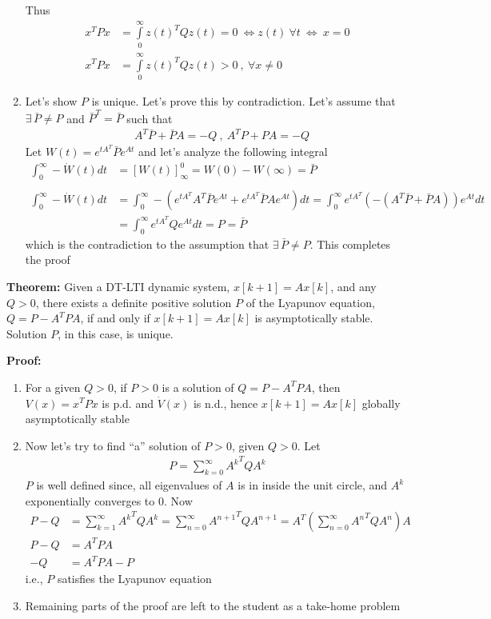 \documentclass[twoside]{article}
\begin{document}
\begin{enumerate}
%
Thus 
%
\begin{align*}
x^T P x &= \int\limits_{0}^{\infty} z(t)^T Q z(t) = 0 \ \iff z(t) \ \forall t 
\ \iff \ x = 0
\\
x^T P x &= \int\limits_{0}^{\infty} z(t)^T Q z(t) > 0 \ , \ \forall x \neq 0
\end{align*}
%
\item Let's show $P$ is unique. Let's prove this by contradiction.
Let's assume that $\exists \, \bar{P} \neq P$ and $\bar{P}^T = \bar{P}$ 
such that  
%
\begin{align*}
&A^T \bar{P} + \bar{P} A = - Q \ , \ A^T P + P A = - Q
\end{align*}
%
Let $W(t) = e^{t A^T} \bar{P} e^{A t}$ and let's analyze the following integral  
%
\begin{align*}
\int_{0}^{\infty} - \dot{W}(t) dt &= \left[ W(t) \right]^{0}_{\infty} = W(0) - W(\infty) = \bar{P}
\\
\\
\int_{0}^{\infty} - \dot{W}(t) dt &=
\int_{0}^{\infty} - \left( e^{t A^T} A^T \bar{P} e^{A t} +
e^{t A^T}\bar{P} A e^{A t} 
\right) dt =
\int_{0}^{\infty} e^{t A^T} ( - \left( A^T \bar{P} +
 \bar{P} A \right) ) e^{A t} dt
 \\
 &= \int_{0}^{\infty} e^{t A^T} Q e^{A t} dt = P = \bar{P}
\end{align*}
%
which is the contradiction to the assumption that $\exists \, \bar{P} \neq P$. This completes the proof
\end{enumerate}

\textbf{Theorem:} Given a DT-LTI dynamic system, $x[k+1] = A x[k]$, and 
any $Q>0$, there exists a definite positive solution $P$ of the Lyapunov equation, $Q = P - A^T P A $, if and only if $x[k+1] = A x[k]$ is asymptotically stable. Solution $P$, in this case, is unique.

\textbf{Proof:} 
\begin{enumerate}
\item For a given $Q > 0$, if $P > 0$ is a solution of $Q = P - A^T P A$, then $V(x) = x^T P x$ is p.d. and $\dot{V}(x)$ is n.d., hence
$x[k+1] = A x[k]$ globally asymptotically stable
%
\item Now let's try to find ``a'' solution of $P > 0$, given $Q>0$. Let
%
\begin{align*}
P = \sum\limits_{k=0}^{\infty} {A^{k}}^T Q A^k \end{align*}
%
$P$ is well defined since, all eigenvalues of $A$ is in inside the unit circle, and 
$A^k$ exponentially converges to $0$. Now
%
\begin{align*}
P - Q &= \sum\limits_{k=1}^{\infty} {A^{k}}^T Q A^k = 
\sum\limits_{n=0}^{\infty} {A^{n+1}}^T Q A^{n+1} 
= A^T \left( \sum\limits_{n=0}^{\infty} {A^{n}}^T Q A^{n} \right) A
\\
P - Q &= A^T P A
\\
-Q &= A^T P A - P
\end{align*} 
%
i.e., $P$ satisfies the Lyapunov equation
%
\item Remaining parts of the proof are left to the student as a take-home problem
\end{enumerate}

\end{document}
